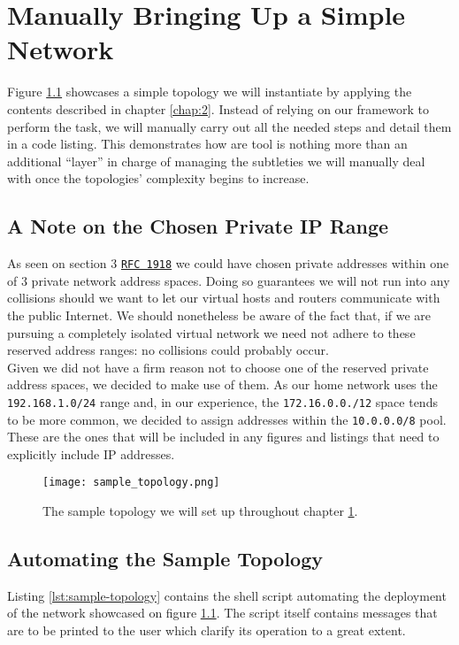 \chapter{Manually Bringing Up a Simple Network} \label{chap:3}
    Figure \ref{fig:sample-topology} showcases a simple topology we will instantiate by applying the contents described in chapter \ref{chap:2}. Instead of relying on our framework to perform the task, we will manually carry out all the needed steps and detail them in a code listing. This demonstrates how are tool is nothing more than an additional ``layer'' in charge of managing the subtleties we will manually deal with once the topologies' complexity begins to increase.\\

    \section{A Note on the Chosen Private IP Range}
        As seen on section $3$ \href{https://datatracker.ietf.org/doc/html/rfc1918#section-3}{\texttt{RFC 1918}} we could have chosen private addresses within one of $3$ private network address spaces. Doing so guarantees we will not run into any collisions should we want to let our virtual hosts and routers communicate with the public Internet. We should nonetheless be aware of the fact that, if we are pursuing a completely isolated virtual network we need not adhere to these reserved address ranges: no collisions could probably occur.\\

        Given we did not have a firm reason not to choose one of the reserved private address spaces, we decided to make use of them. As our home network uses the \texttt{192.168.1.0/24} range and, in our experience, the \texttt{172.16.0.0./12} space tends to be more common, we decided to assign addresses within the \texttt{10.0.0.0/8} pool. These are the ones that will be included in any figures and listings that need to explicitly include IP addresses.\\

    \begin{figure}
        \centering
        \texttt{[image: sample\_topology.png]}
        \caption{The sample topology we will set up throughout chapter \ref{chap:3}.}
        \label{fig:sample-topology}
    \end{figure}

    \section{Automating the Sample Topology}
        Listing \ref{lst:sample-topology} contains the shell script automating the deployment of the network showcased on figure \ref{fig:sample-topology}. The script itself contains messages that are to be printed to the user which clarify its operation to a great extent.\\

